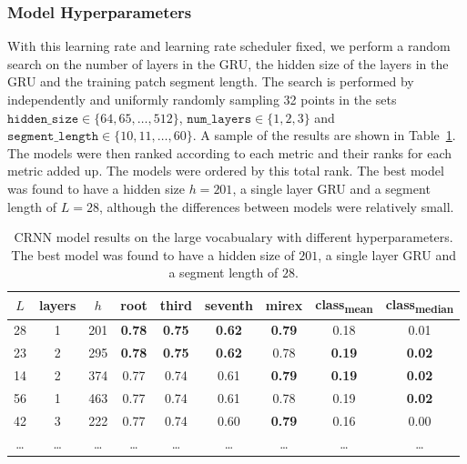\subsubsection{Model Hyperparameters}

With this learning rate and learning rate scheduler fixed, we perform a random search on the number of layers in the GRU, the hidden size of the layers in the GRU and the training patch segment length. The search is performed by independently and uniformly randomly sampling 32 points in the sets $\texttt{hidden\_size}\in\{64,65,\ldots,512\}$, $\texttt{num\_layers}\in\{1,2,3\}$ and $\texttt{segment\_length}\in\{10,11,\ldots,60\}$. A sample of the results are shown in Table~\ref{tab:crnn_hparams}. The models were then ranked according to each metric and their ranks for each metric added up. The models were ordered by this total rank. The best model was found to have a hidden size $h=201$, a single layer GRU and a segment length of $L=28$, although the differences between models were relatively small.

\begin{table}[h]
    \centering
    \begin{tabular}{ccccccccc}
        \toprule
        $L$ & layers & $h$ & root & third & seventh & mirex & class\textsubscript{mean} & class\textsubscript{median} \\
        \midrule
        28 & 1 & 201 & \textbf{0.78} & \textbf{0.75} & \textbf{0.62} & \textbf{0.79} & 0.18 & 0.01 \\
        23 & 2 & 295 & \textbf{0.78} & \textbf{0.75} & \textbf{0.62} & 0.78 & \textbf{0.19} & \textbf{0.02} \\
        14 & 2 & 374 & 0.77 & 0.74 & 0.61 & \textbf{0.79} & \textbf{0.19} & \textbf{0.02} \\
        56 & 1 & 463 & 0.77 & 0.74 & 0.61 & 0.78 & 0.19 & \textbf{0.02} \\
        42 & 3 & 222 & 0.77 & 0.74 & 0.60 & \textbf{0.79} & 0.16 & 0.00 \\
        \ldots & \ldots & \ldots & \ldots & \ldots & \ldots & \ldots & \ldots & \ldots \\
        \bottomrule
    \end{tabular}
    \caption{CRNN model results on the large vocabualary with different hyperparameters. The best model was found to have a hidden size of $201$, a single layer GRU and a segment length of $28$.}\label{tab:crnn_hparams}
\end{table}


